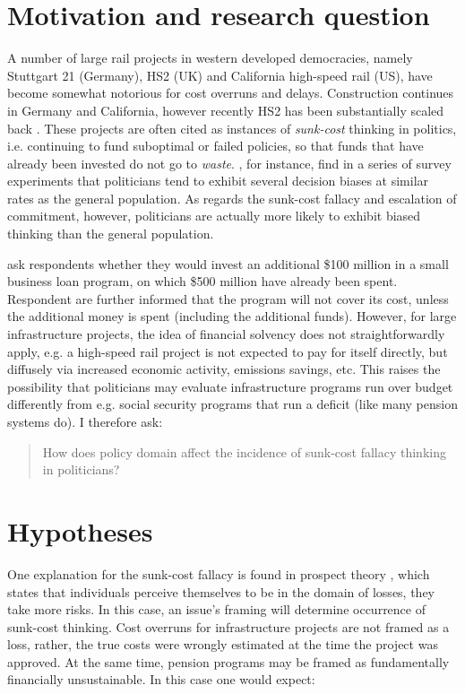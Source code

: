 
\setcounter{page}{1}
\normalsize
{}



\section*{Motivation and research question}

A number of large rail projects in western developed democracies, namely Stuttgart 21 (Germany), HS2 (UK) and California high-speed rail (US), have become somewhat notorious for cost overruns and delays. Construction continues in Germany and California, however recently HS2 has been substantially scaled back \parencite{May2023}. These projects are often cited as instances of \textit{sunk-cost} thinking in politics, i.e. continuing to fund suboptimal or failed policies, so that funds that have already been invested do not go to \textit{waste}. \textcite{Sheffer2017}, for instance, find in a series of survey experiments that politicians tend to exhibit several decision biases at similar rates as the general population. As regards the sunk-cost fallacy and escalation of commitment, however, politicians are actually more likely to exhibit biased thinking than the general population. 

\textcite[][]{Sheffer2017} ask respondents whether they would invest an additional \$100 million in a small business loan program, on which \$500 million have already been spent. Respondent are further informed that the program will not cover its cost, unless the additional money is spent (including the additional funds). However, for large infrastructure projects, the idea of financial solvency does not straightforwardly apply, e.g. a high-speed rail project is not expected to pay for itself directly, but diffusely via increased economic activity, emissions savings, etc. This raises the possibility that politicians may evaluate infrastructure programs run over budget differently from e.g. social security programs that run a deficit (like many pension systems do). I therefore ask:


\begin{quote}
  How does policy domain affect the incidence of sunk-cost fallacy thinking in politicians?
\end{quote}
 
\section*{Hypotheses}
One explanation for the sunk-cost fallacy is found in prospect theory \parencites{Kahnemann1979}{Arkes1985}, which states that individuals perceive themselves to be in the domain of losses, they take more risks. In this case, an issue's framing will determine occurrence of sunk-cost thinking. Cost overruns for infrastructure projects are not framed as a loss, rather, the true costs were wrongly estimated at the time the project was approved. At the same time, pension programs may be framed as fundamentally financially unsustainable. In this case one would expect:

